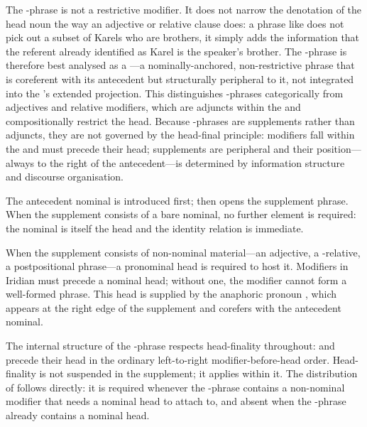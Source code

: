 The -phrase is not a restrictive modifier. It does not narrow the
denotation of the head noun the way an adjective or relative clause does: a
phrase like  does not pick out a subset of Karels who are
brothers, it simply adds the information that the referent already identified as
Karel is the speaker's brother. The -phrase is therefore best analysed
as a ---a nominally-anchored, non-restrictive phrase that is
coreferent with its antecedent but structurally peripheral to it, not integrated
into the 's extended projection. This distinguishes -phrases
categorically from adjectives and relative modifiers, which are adjuncts within
the  and compositionally restrict the head. Because -phrases
are supplements rather than adjuncts, they are not governed by the head-final
principle: modifiers fall within the  and must precede their head;
supplements are peripheral and their position---always to the right of the
antecedent---is determined by information structure and discourse organisation.

The antecedent nominal is introduced first;  then opens the supplement
phrase. When the supplement consists of a bare nominal, no further element is
required: the nominal is itself the head and the identity relation is immediate.

\pex
\a {}
\xe

When the supplement consists of non-nominal material---an adjective, a
-relative, a postpositional phrase---a pronominal head is required to
host it. Modifiers in Iridian must precede a nominal head; without one, the
modifier cannot form a well-formed phrase. This head is supplied by the
anaphoric pronoun , which appears at the right edge of the supplement and
corefers with the antecedent nominal.

\pex
\a {}
\a {}
\xe

\noindent The internal structure of the -phrase respects head-finality
throughout:  and  precede their head  in
the ordinary left-to-right modifier-before-head order. Head-finality is not
suspended in the supplement; it applies within it. The distribution of 
follows directly: it is required whenever the -phrase contains a
non-nominal modifier that needs a nominal head to attach to, and absent when the
-phrase already contains a nominal head.

